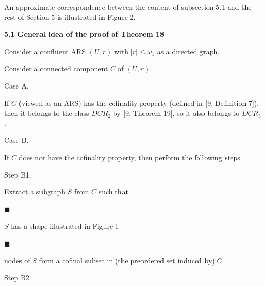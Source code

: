  
 
An approximate correspondence between the content of subsection 5.1 and the rest of Section 5 is illustrated in Figure 2.\par
 
 
 
\par\medskip\noindent\textbf{5.1 General idea of the proof of Theorem 18}\par
 
 
Consider a confluent ARS $(U,r)$ with $|r|\leq\omega_{1}$ as a directed graph.\par
 
 
 
Consider a connected component $C$ of $(U,r)$.\par
  Case A.  
 
If $C$ (viewed as an ARS) has the cofinality property (defined in [9, Definition 7]), then it belongs to the class $DCR_{2}$ by [9, Theorem 19], so it also belongs to $DCR_{3}$.\par
 
  Case B.  
 
If $C$ does not have the cofinality property, then perform the following steps.\par
  Step B1.  
 
Extract a subgraph $S$ from $C$ such that\par
  
\par\noindent  $\blacksquare$ 
 
$S$ has a shape illustrated in Figure 1\par
 
 
 
\par\noindent  $\blacksquare$ 
 
nodes of $S$ form a cofinal subset in (the preordered set induced by) $C$.\par
 
 
  
  Step B2.  
 
